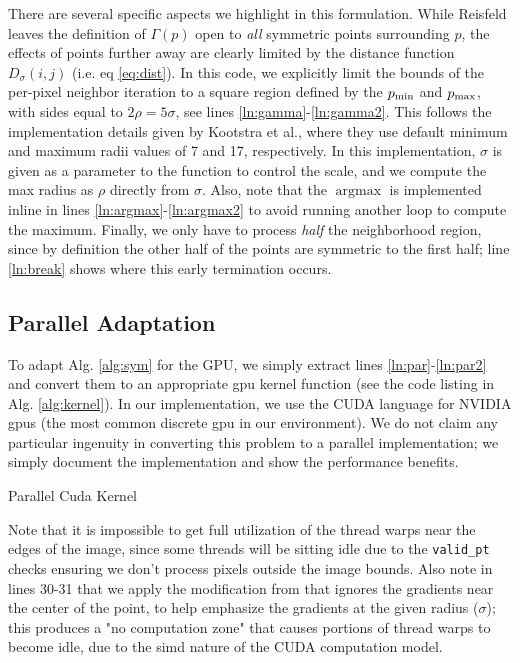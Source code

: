 There are several specific aspects we highlight in this formulation. While Reisfeld leaves the definition of \(\Gamma(p)\) open to \emph{all} symmetric points surrounding \(p\), the effects of points further away are clearly limited by the distance function \(D_\sigma(i,j)\) (i.e. eq \ref{eq:dist}). In this code, we explicitly limit the bounds of the per-pixel neighbor iteration to a square region defined by the \(p_{\min}\) and \(p_{\max}\), with sides equal to \(2\rho = 5\sigma\), see lines \ref{ln:gamma}-\ref{ln:gamma2}. This follows the implementation details given by Kootstra et al.\cite{kootstra_using_2010}, where they use default minimum and maximum radii values of 7 and 17, respectively. In this implementation, \(\sigma\) is given as a parameter to the function to control the scale, and we compute the max radius as \(\rho\) directly from \(\sigma\). Also, note that the \(\operatorname{argmax}\) is implemented inline in lines \ref{ln:argmax}-\ref{ln:argmax2} to avoid running another loop to compute the maximum. Finally, we only have to process \emph{half} the neighborhood region, since by definition the other half of the points are symmetric to the first half; line \ref{ln:break} shows where this early termination occurs. 


\subsection{Parallel Adaptation}
\label{sec:parallel}

To adapt Alg. \ref{alg:sym} for the GPU, we simply extract lines \ref{ln:par}-\ref{ln:par2} and convert them to an appropriate \gls{gpu} kernel function (see the code listing in Alg. \ref{alg:kernel}). In our implementation, we use the CUDA language for NVIDIA \glspl{gpu} (the most common discrete \gls{gpu} in our environment). We do not claim any particular ingenuity in converting this problem to a parallel implementation; we simply document the implementation and show the performance benefits. 

\Needspace{0.8\textheight}
\begin{algorithm}[!htp]
\caption{Parallel Cuda Kernel}\label{alg:kernel}

\end{algorithm}

Note that it is impossible to get full utilization of the thread warps near the edges of the image, since some threads will be sitting idle due to the \texttt{valid\_pt} checks ensuring we don't process pixels outside the image bounds. Also note in lines 30-31 that we apply the modification from \cite{kootstra_using_2010} that ignores the gradients near the center of the point, to help emphasize the gradients at the given radius (\(\sigma\)); this produces a "no computation zone" that causes portions of thread warps to become idle, due to the \gls{simd} nature of the CUDA computation model.

